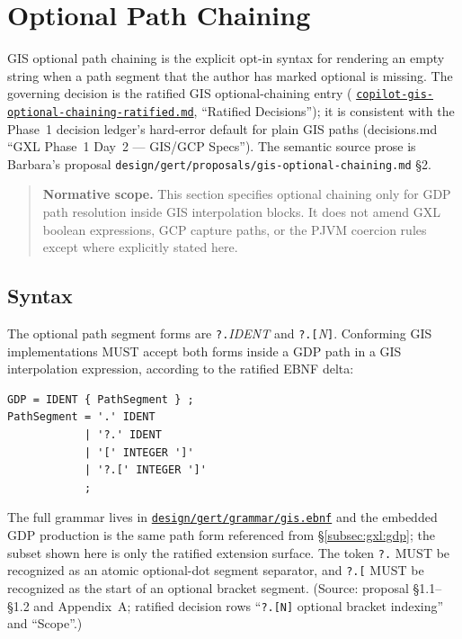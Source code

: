 \section{Optional Path Chaining}
\label{sec:gis:optional-chaining}

GIS optional path chaining is the explicit opt-in syntax for rendering an
empty string when a path segment that the author has marked optional is
missing.  The governing decision is the ratified GIS optional-chaining entry
(
\href{run:../../../.squad/decisions/inbox/copilot-gis-optional-chaining-ratified.md}{\texttt{copilot-gis-optional-chaining-ratified.md}},
``Ratified Decisions''); it is consistent with the Phase~1 decision ledger's
hard-error default for plain GIS paths (decisions.md ``GXL Phase~1 Day~2 ---
GIS/GCP Specs'').  The semantic source prose is Barbara's proposal
\texttt{design/gert/proposals/gis-optional-chaining.md} \S2.

\begin{quote}
\noindent\textbf{Normative scope.}
This section specifies optional chaining only for GDP path resolution inside
GIS interpolation blocks.  It does not amend GXL boolean expressions, GCP
capture paths, or the PJVM coercion rules except where explicitly stated here.
\end{quote}

\subsection{Syntax}
\label{subsec:gis:optional-chaining:syntax}

The optional path segment forms are \texttt{?.}\textit{IDENT} and
\texttt{?.[}\textit{N}\texttt{]}.  Conforming GIS implementations MUST accept
both forms inside a GDP path in a GIS interpolation expression, according to
the ratified EBNF delta:

\begin{verbatim}
GDP = IDENT { PathSegment } ;
PathSegment = '.' IDENT
            | '?.' IDENT
            | '[' INTEGER ']'
            | '?.[' INTEGER ']'
            ;
\end{verbatim}

\noindent The full grammar lives in
\href{run:../grammar/gis.ebnf}{\texttt{design/gert/grammar/gis.ebnf}} and the
embedded GDP production is the same path form referenced from
\S\ref{subsec:gxl:gdp}; the subset shown here is only the ratified extension
surface.  The token \texttt{?.} MUST be recognized as an atomic optional-dot
segment separator, and \texttt{?.[} MUST be recognized as the start of an
optional bracket segment.  (Source: proposal \S1.1--\S1.2 and Appendix~A;
ratified decision rows ``\texttt{?.[N]} optional bracket indexing'' and
``Scope''.)

